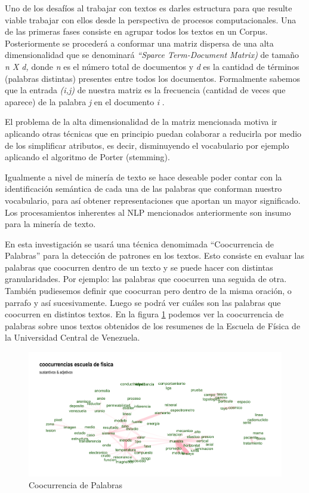 \documentclass[
  10,
  openany]{book}
\begin{document}
Uno de los desafíos al trabajar con textos es darles estructura para que resulte viable trabajar con ellos desde la perspectiva de procesos computacionales. Una de las primeras fases consiste en agrupar todos los textos en un Corpus. Posteriormente se procederá a conformar una matriz dispersa de una alta dimensionalidad que se denominará \emph{``Sparce Term-Document Matrix)} de tamaño \emph{n X d,} donde \emph{n} es el número total de documentos y \emph{d} es la cantidad de términos (palabras distintas) presentes entre todos los documentos. Formalmente sabemos que la entrada \emph{(i,j)} de nuestra matriz es la frecuencia (cantidad de veces que aparece) de la palabra \emph{j} en el documento \emph{i} .

El problema de la alta dimensionalidad de la matriz mencionada motiva ir aplicando otras técnicas que en principio puedan colaborar a reducirla por medio de los simplificar atributos, es decir, disminuyendo el vocabulario por ejemplo aplicando el algoritmo de Porter (stemming).

Igualmente a nivel de minería de texto se hace deseable poder contar con la identificación semántica de cada una de las palabras que conforman nuestro vocabulario, para así obtener representaciones que aportan un mayor significado. Los procesamientos inherentes al NLP mencionados anteriormente son insumo para la minería de texto.

En esta investigación se usará una técnica denomimada ``Coocurrencia de Palabras'' para la detección de patrones en los textos. Esto consiste en evaluar las palabras que coocurren dentro de un texto y se puede hacer con distintas granularidades. Por ejemplo: las palabras que coocurren una seguida de otra. También pudiesemos definir que coocurran pero dentro de la misma oración, o parrafo y así sucesivamente. Luego se podrá ver cuáles son las palabras que coocurren en distintos textos. En la figura \ref{fig:coocejem} podemos ver la coocurrencia de palabras sobre unos textos obtenidos de los resumenes de la Escuela de Física de la Universidad Central de Venezuela.

\begin{figure}

{\centering \includegraphics[width=0.9\linewidth]{images/02-marco-teorico/cooc} 

}

\caption{Coocurrencia de Palabras}\label{fig:coocejem}
\end{figure}
\end{document}
